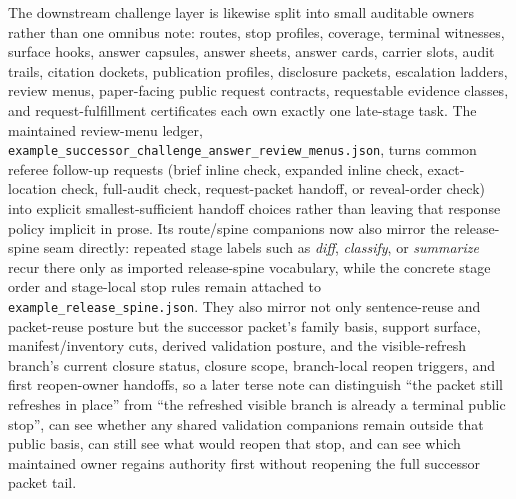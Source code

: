 \documentclass[11pt]{article}
\begin{document}
The downstream challenge layer is likewise split into small auditable owners rather than one omnibus note: routes, stop profiles, coverage, terminal witnesses, surface hooks, answer capsules, answer sheets, answer cards, carrier slots, audit trails, citation dockets, publication profiles, disclosure packets, escalation ladders, review menus, paper-facing public request contracts, requestable evidence classes, and request-fulfillment certificates each own exactly one late-stage task.
The maintained review-menu ledger, \texttt{example\_successor\_challenge\_answer\_review\_menus.json}, turns common referee follow-up requests (brief inline check, expanded inline check, exact-location check, full-audit check, request-packet handoff, or reveal-order check) into explicit smallest-sufficient handoff choices rather than leaving that response policy implicit in prose.
Its route/spine companions now also mirror the release-spine seam directly: repeated stage labels such as \emph{diff}, \emph{classify}, or \emph{summarize} recur there only as imported release-spine vocabulary, while the concrete stage order and stage-local stop rules remain attached to \texttt{example\_release\_spine.json}. They also mirror not only sentence-reuse and packet-reuse posture but the successor packet's family basis, support surface, manifest/inventory cuts, derived validation posture, and the visible-refresh branch's current closure status, closure scope, branch-local reopen triggers, and first reopen-owner handoffs, so a later terse note can distinguish ``the packet still refreshes in place'' from ``the refreshed visible branch is already a terminal public stop'', can see whether any shared validation companions remain outside that public basis, can still see what would reopen that stop, and can see which maintained owner regains authority first without reopening the full successor packet tail.
\end{document}
